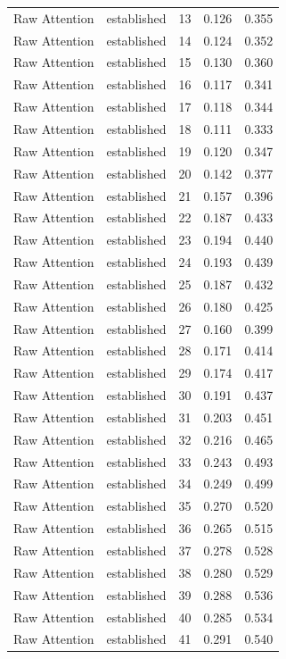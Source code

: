 \begin{tabular}{llrrr}
Raw Attention & established & 13 & 0.126 & 0.355 \\
Raw Attention & established & 14 & 0.124 & 0.352 \\
Raw Attention & established & 15 & 0.130 & 0.360 \\
Raw Attention & established & 16 & 0.117 & 0.341 \\
Raw Attention & established & 17 & 0.118 & 0.344 \\
Raw Attention & established & 18 & 0.111 & 0.333 \\
Raw Attention & established & 19 & 0.120 & 0.347 \\
Raw Attention & established & 20 & 0.142 & 0.377 \\
Raw Attention & established & 21 & 0.157 & 0.396 \\
Raw Attention & established & 22 & 0.187 & 0.433 \\
Raw Attention & established & 23 & 0.194 & 0.440 \\
Raw Attention & established & 24 & 0.193 & 0.439 \\
Raw Attention & established & 25 & 0.187 & 0.432 \\
Raw Attention & established & 26 & 0.180 & 0.425 \\
Raw Attention & established & 27 & 0.160 & 0.399 \\
Raw Attention & established & 28 & 0.171 & 0.414 \\
Raw Attention & established & 29 & 0.174 & 0.417 \\
Raw Attention & established & 30 & 0.191 & 0.437 \\
Raw Attention & established & 31 & 0.203 & 0.451 \\
Raw Attention & established & 32 & 0.216 & 0.465 \\
Raw Attention & established & 33 & 0.243 & 0.493 \\
Raw Attention & established & 34 & 0.249 & 0.499 \\
Raw Attention & established & 35 & 0.270 & 0.520 \\
Raw Attention & established & 36 & 0.265 & 0.515 \\
Raw Attention & established & 37 & 0.278 & 0.528 \\
Raw Attention & established & 38 & 0.280 & 0.529 \\
Raw Attention & established & 39 & 0.288 & 0.536 \\
Raw Attention & established & 40 & 0.285 & 0.534 \\
Raw Attention & established & 41 & 0.291 & 0.540 \\

\end{tabular}
